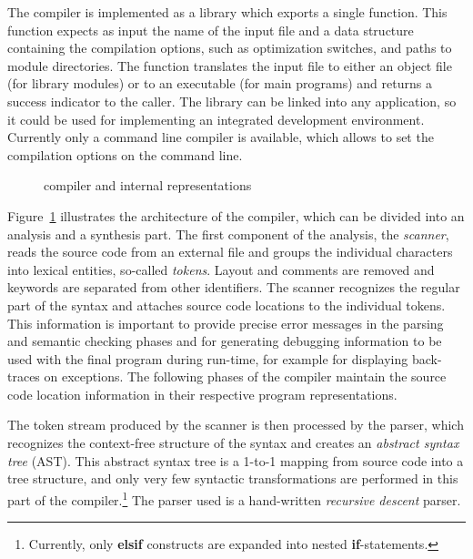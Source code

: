 The \turtle{} compiler is implemented as a library which exports a
single function.  This function expects as input the name of the input
file and a data structure containing the compilation options, such as
optimization switches, and paths to module directories.  The function
translates the input file to either an object file (for library
modules) or to an executable (for main programs) and returns a success
indicator to the caller.  The library can be linked into any
application, so it could be used for implementing an integrated
development environment.  Currently only a command line compiler is
available, which allows to set the compilation options on the command
line.

\begin{figure}[htp]
\begin{center}

\end{center}
\caption{\turtle{} compiler and internal representations}
\label{pic:compiler}
\end{figure}

%
Figure~\ref{pic:compiler} illustrates the architecture of the
\turtle{} compiler, which can be divided into an analysis and a
synthesis part.  The first component of the analysis, the {\em
  scanner}, reads the source code from an external file and groups the
individual characters into lexical entities, so-called {\em tokens}.
Layout and comments are removed and keywords are separated from other
identifiers.  The scanner recognizes the regular part of the \turtle{}
syntax and attaches source code locations to the individual tokens.
This information is important to provide precise error messages in the
parsing and semantic checking phases and for generating debugging
information to be used with the final program during run-time, for
example for displaying back-traces on exceptions.  The following
phases of the compiler maintain the source code location information
in their respective program representations.

%
The token stream produced by the scanner is then processed by the
parser, which recognizes the context-free structure of the syntax and
creates an {\em abstract syntax tree} (AST).  This abstract syntax
tree is a 1-to-1 mapping from source code into a tree structure, and
only very few syntactic transformations are performed in this part of
the compiler.\footnote{Currently, only {\bf elsif} constructs are
  expanded into nested {\bf if}-statements.}  The parser used is a
hand-written {\em recursive descent} parser.

